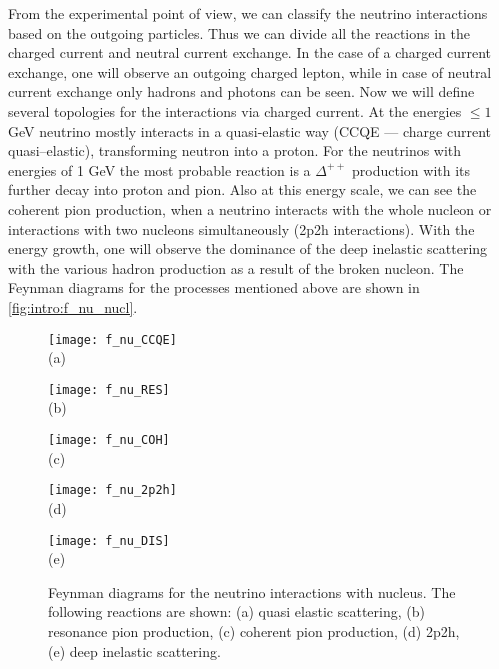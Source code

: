 \documentclass[../main.tex]{subfiles}
\begin{document}
From the experimental point of view, we can classify the neutrino interactions based on the outgoing particles. Thus we can divide all the reactions in the charged current and neutral current exchange. In the case of a charged current exchange, one will observe an outgoing charged lepton, while in case of neutral current exchange only hadrons and photons can be seen. Now we will define several topologies for the interactions via charged current. At the energies $\le1$ GeV neutrino mostly interacts in a quasi-elastic way (CCQE --- charge current quasi--elastic), transforming neutron into a proton. For the neutrinos with energies of 1 GeV the most probable reaction is a $\Delta^{++}$ production with its further decay into proton and pion. Also at this energy scale, we can see the coherent pion production, when a neutrino interacts with the whole nucleon or interactions with two nucleons simultaneously (2p2h interactions). With the energy growth, one will observe the dominance of the deep inelastic scattering with the various hadron production as a result of the broken nucleon. The Feynman diagrams for the processes mentioned above are shown in \autoref{fig:intro:f_nu_nucl}.

\begin{figure}[!ht]
  \centering
  \begin{minipage}{0.29\linewidth}
    \centering
    \texttt{[image: f\_nu\_CCQE]} \\ (a)
  \end{minipage}
  \begin{minipage}{0.29\linewidth}
    \centering
    \texttt{[image: f\_nu\_RES]} \\ (b)
  \end{minipage}
  \begin{minipage}{0.29\linewidth}
    \centering
    \texttt{[image: f\_nu\_COH]} \\ (c)
  \end{minipage}
  \vfill
  \begin{minipage}{0.29\linewidth}
    \centering
    \texttt{[image: f\_nu\_2p2h]} \\ (d)
  \end{minipage}
  \begin{minipage}{0.29\linewidth}
    \centering
    \texttt{[image: f\_nu\_DIS]} \\ (e)
  \end{minipage}
  \caption{Feynman diagrams for the neutrino interactions with nucleus. The following reactions are shown: (a) quasi elastic scattering, (b) resonance pion production, (c) coherent pion production, (d) 2p2h, (e) deep inelastic scattering.}
  \label{fig:intro:f_nu_nucl}
\end{figure}
\end{document}
